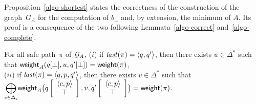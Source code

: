 Proposition~\ref{algo-shortest} states the correctness of the construction of the graph~$G_A$ for the computation of $b_\bot$
and, by extension, the minimum of $A$.
Its proof is a consequence of the two following Lemmata~\ref{algo-correct} and~\ref{algo-complete}.


\begin{lemma}[Correctness]\label{algo-correct}
For all safe path~$\pi$ of~$\mathcal{G}_A$,  %
($i$) if $\last(\pi) = \< q, q'>$, %
then there exists $u \in \Delta^*$ such that 
$\mathsf{weight}_A(q[\bot], u, q'[\bot]) = \mathsf{weight}(\pi)$,\\
%
($ii$) if $\last(\pi) = \< q, p, q'>$, %
then there exists $v \in \Delta^*$ such that \\
${\displaystyle\bigoplus_{c \in \Deltac}}
 \weight_A\bigl(\configup{q}{\< c, p> \stackup \top }, v, \configup{q'}{\<c, p> \stackup \top}\bigr)
 = \weight(\pi)$.
\end{lemma}
%
